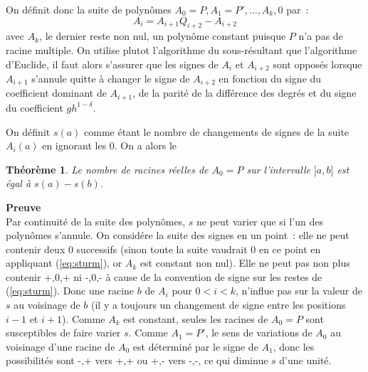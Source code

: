 \documentclass[a4paper,11pt]{article}
\newtheorem{thm}{Théorème}
\begin{document}
On d\'efinit donc la suite de polyn\^omes $A_0=P, A_1=P', ..., A_k,0$
par~:
\begin{equation} \label{eq:sturm}
 A_{i} = A_{i+1} Q_{i+2} - A_{i+2} 
\end{equation}
avec $A_k$, le dernier reste non nul, un polyn\^ome constant puisque
$P$ n'a pas de racine multiple. On utilise plutot l'algorithme du 
sous-r\'esultant que l'algorithme d'Euclide, il faut alors
s'assurer que les signes de $A_i$ et $A_{i+2}$ sont oppos\'es lorsque
$A_{i+1} $ s'annule quitte \`a changer le signe de $A_{i+2}$ en fonction
du signe du coefficient dominant de $A_{i+1}$, de la parit\'e de
la diff\'erence des degr\'es et du signe du coefficient $gh^{1-\delta}$.

On d\'efinit $s(a)$ comme \'etant le nombre de changements de signes
de la suite $A_i(a)$ en ignorant les 0.
On a alors le 
\begin{thm}
Le nombre de racines r\'eelles de $A_0=P$ sur l'intervalle
$]a,b]$ est \'egal \`a $s(a)-s(b)$.
\end{thm}

{\bf Preuve}\\
Par continuit\'e de la suite des polyn\^omes, $s$ ne peut varier que
si l'un des polyn\^omes s'annule.
On consid\'ere la suite des signes en un point~: elle ne peut contenir
deux 0 successifs (sinon toute la suite vaudrait 0 en ce point en appliquant
(\ref{eq:sturm}), or $A_k$ est constant non nul). Elle ne peut pas
non plus contenir +,0,+ ni -,0,- \`a cause de la convention de signe
sur les restes de (\ref{eq:sturm}). Donc une racine $b$
de $A_i$ pour $0<i<k$, n'influe pas sur la valeur de $s$ au voisinage
de $b$ (il y a toujours un changement de signe entre les positions
$i-1$ et $i+1$). Comme $A_k$ est constant, seules les racines de $A_0=P$
sont susceptibles de faire varier $s$. Comme $A_1=P'$, le sens de
variations de $A_0$ au voisinage d'une racine de $A_0$ est d\'etermin\'e
par le signe de $A_1$, donc les possibilit\'es sont -,+ vers +,+
ou +,- vers -,-, ce qui diminue $s$ d'une unit\'e.
\end{document}
